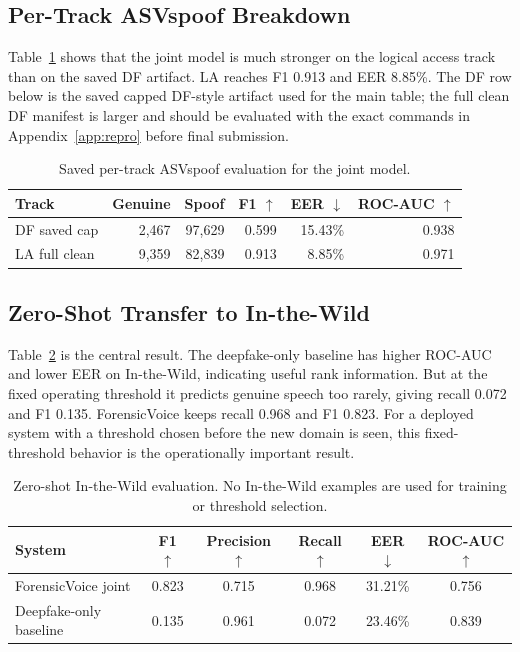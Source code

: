 \documentclass{article}
\newcommand{\fv}{ForensicVoice}
\newcommand{\eer}{EER}
\newcommand{\asv}{ASVspoof}
\newcommand{\itw}{In-the-Wild}
\begin{document}
\subsection{Per-Track ASVspoof Breakdown}

Table~\ref{tab:tracks} shows that the joint model is much stronger on the
logical access track than on the saved DF artifact.  LA reaches F1 0.913 and
\eer{} 8.85\%.  The DF row below is the saved capped DF-style artifact used for
the main table; the full clean DF manifest is larger and should be evaluated
with the exact commands in Appendix~\ref{app:repro} before final submission.

\begin{table}[t]
  \centering
  \caption{Saved per-track \asv{} evaluation for the joint model.}
  \label{tab:tracks}
  \small
  \begin{tabular}{lrrrrr}
    \toprule
    Track & Genuine & Spoof & F1 $\uparrow$ & \eer{} $\downarrow$ &
    ROC-AUC $\uparrow$ \\
    \midrule
    DF saved cap & 2,467 & 97,629 & 0.599 & 15.43\% & 0.938 \\
    LA full clean & 9,359 & 82,839 & 0.913 & 8.85\% & 0.971 \\
    \bottomrule
  \end{tabular}
\end{table}

\subsection{Zero-Shot Transfer to In-the-Wild}

Table~\ref{tab:itw} is the central result.  The deepfake-only baseline has
higher ROC-AUC and lower \eer{} on \itw{}, indicating useful rank information.
But at the fixed operating threshold it predicts genuine speech too rarely,
giving recall 0.072 and F1 0.135.  \fv{} keeps recall 0.968 and F1 0.823.  For
a deployed system with a threshold chosen before the new domain is seen, this
fixed-threshold behavior is the operationally important result.

\begin{table}[t]
  \centering
  \caption{Zero-shot \itw{} evaluation.  No \itw{} examples are used for
  training or threshold selection.}
  \label{tab:itw}
  \small
  \begin{tabular}{lccccc}
    \toprule
    System & F1 $\uparrow$ & Precision $\uparrow$ & Recall $\uparrow$ &
    \eer{} $\downarrow$ & ROC-AUC $\uparrow$ \\
    \midrule
    \fv{} joint & 0.823 & 0.715 & 0.968 & 31.21\% & 0.756 \\
    Deepfake-only baseline & 0.135 & 0.961 & 0.072 & 23.46\% & 0.839 \\
    \bottomrule
  \end{tabular}
\end{table}
\end{document}
